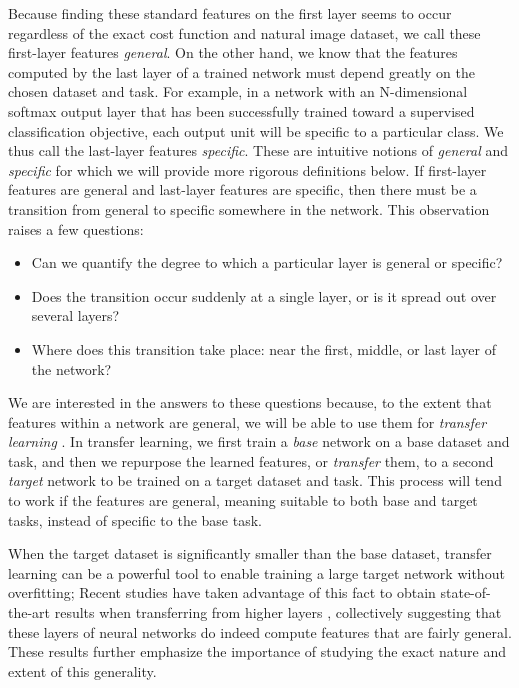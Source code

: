 Because finding these standard features on the first layer seems to occur regardless of the exact cost function and natural image dataset, we call these first-layer features \emph{general}. On the other hand, we know that the features computed by the last layer of a trained network must depend greatly on the chosen dataset and task. For example, in a network with an N-dimensional softmax output layer that has been successfully trained toward a supervised classification objective, each output unit will be specific to a particular class. We thus call the last-layer features \emph{specific}. These are intuitive notions of \emph{general} and \emph{specific} for which we will provide more rigorous definitions below.
If first-layer features are general and last-layer features are specific, then there must be a transition from general to specific somewhere in the network. This observation raises a few questions:

\begin{itemize}[leftmargin=2em]
	\item Can we quantify the degree to which a particular layer is general or specific?
	\item Does the transition occur suddenly at a single layer, or is it spread out over several layers?
	\item Where does this transition take place: near the first, middle, or last layer of the network?
\end{itemize}

We are interested in the answers to these questions because, to the extent that features within a network are general, we will be able to use them for 
\emph{transfer learning} \citep{caruana95,Bengio+al-AI-2011-small,UTLC+DL+tutorial-2011-small}.
In transfer learning, we first train
 a \emph{base} network on a base dataset and task, and then we repurpose the learned features, or \emph{transfer} them, to a second \emph{target} network to be trained on a target dataset and task. This process will tend to work if the features are general, meaning suitable to both base and target tasks, instead of specific to the base task.

When the target dataset is significantly smaller than the base dataset, transfer learning can be a powerful tool to enable training a large target network without overfitting; Recent studies have taken advantage of this fact to obtain
state-of-the-art results when transferring from higher layers \citep{donahue+jia-2013-arxiv,Zeiler+et+al-arxiv2013b,sermanet2013overfeat:-integrated-recognition}, collectively suggesting that these layers
of neural networks do indeed compute features that are fairly general. These results further emphasize the importance of studying
the exact nature and extent of this generality.


